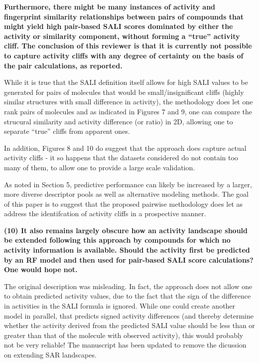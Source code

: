 \documentclass[letterpaper, 12pt]{article}
\begin{document}
\textbf{Furthermore, there might be many instances of activity and fingerprint similarity
  relationships between pairs of compounds that might yield high pair-based SALI scores dominated by
  either the activity or similarity component, without forming a “true” activity cliff. The
  conclusion of this reviewer is that it is currently not possible to capture activity cliffs with
  any degree of certainty on the basis of the pair calculations, as reported.}

While it is true that the SALI definition itself allows for high SALI values to be generated for
pairs of molecules that would be small/insignificant cliffs (highly similar structures with small
difference in activity), the methodology does let one rank pairs of molecules and as indicated in
Figures 7 and 9, one can compare the strucural similarity and activity difference (or ratio) in 2D,
allowing one to separate ``true'' cliffs from apparent ones.

In addition, Figures 8 and 10 do suggest that the approach does capture actual activity cliffs - it
so happens that the datasets considered do not contain too many of them, to allow one to provide a
large scale validation.

As noted in Section 5, predictive performance can likely be increased by a larger, more diverse
descriptor pools as well as alternative modeling methods. The goal of this paper is to suggest that
the proposed pairwise methodology does let as address the identifcation of activity cliffs in a
prospective manner.

\textbf{(10) It also remains largely obscure how an activity landscape should be extended following
  this approach by compounds for which no activity information is available. Should the activity
  first be predicted by an RF model and then used for pair-based SALI score calculations?  One would
  hope not.}

The original description was misleading. In fact, the approach does not allow one to obtain
predicted activity values, due to the fact that the sign of the difference in activities in the SALI
formula is ignored. While one could create another model in parallel, that predicts signed activity
differences (and thereby determine whether the activity derived from the predicted SALI value should
be less than or greater than that of the molecule with observed activity), this would probably not
be very reliable! The manuscript has been updated to remove the dicussion on extending SAR
landscapes.
\end{document}
